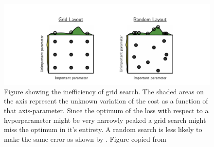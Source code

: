 \begin{figure}[H]
\centering
\hspace*{-1.3in}\includegraphics{../figures/randomsearch.png}
\caption{Figure showing the inefficiency of grid search. The shaded areas on the axis represent the unknown variation of the cost as a function of that axis-parameter. Since the optimum of the loss with respect to a hyperparameter might be very narrowly peaked a grid search might miss the optimum in it's entirety. A random search is less likely to make the same error as shown by \citet{Bergstra2012}. Figure copied from \citet{Bergstra2012}}\label{fig:randomsearch}
\end{figure} 
